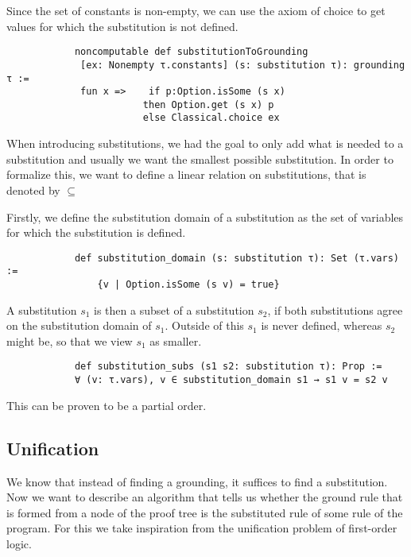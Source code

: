 \documentclass{article}
\begin{document}
            Since the set of constants is non-empty, we can use the axiom of choice to get values for which the substitution is not defined.

            \begin{lstlisting}
            noncomputable def substitutionToGrounding 
             [ex: Nonempty τ.constants] (s: substitution τ): grounding τ := 
             fun x =>    if p:Option.isSome (s x) 
                        then Option.get (s x) p 
                        else Classical.choice ex

            \end{lstlisting}

            When introducing substitutions, we had the goal to only add what is needed to a substitution and usually we want the smallest possible substitution. In order to formalize this, we want to define a linear relation on substitutions, that is denoted by $\subseteq$

            Firstly, we define the substitution domain of a substitution as the set of variables for which the substitution is defined. 

            \begin{lstlisting}
            def substitution_domain (s: substitution τ): Set (τ.vars) := 
                {v | Option.isSome (s v) = true}
            \end{lstlisting}

            A substitution $s_1$ is then a subset of a substitution $s_2$, if both substitutions agree on the substitution domain of $s_1$. Outside of this $s_1$ is never defined, whereas $s_2$ might be, so that we view $s_1$ as smaller.

            \begin{lstlisting}
            def substitution_subs (s1 s2: substitution τ): Prop :=
            ∀ (v: τ.vars), v ∈ substitution_domain s1 → s1 v = s2 v
            \end{lstlisting}

            This can be proven to be a partial order.

        \subsection{Unification}

        We know that instead of finding a grounding, it suffices to find a substitution. Now we want to describe an algorithm that tells us whether the ground rule that is formed from a node of the proof tree is the substituted rule of some rule of the program. For this we take inspiration from the unification problem of first-order logic.
\end{document}

